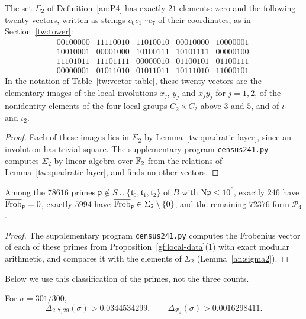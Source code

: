 \begin{lemma}\label{an:sigma2}
The set $\Sigma_2$ of Definition~\ref{an:P4} has exactly $21$ elements: zero
and the following twenty vectors, written as strings $c_0c_1\cdots c_7$ of
their coordinates, as in Section~\ref{tw:tower}:
\[
\begin{array}{ccccc}
 00100000&11110010&11010010&00010000&10000001\\
 10010001&00001000&10100111&10101111&00000100\\
 11101011&11101111&00000010&01100101&01100111\\
 00000001&01011010&01011011&10111010&11000101.
\end{array}
\]
In the notation of Table~\ref{tw:vector-table}, these twenty vectors are the
elementary images of the local involutions $x_j$, $y_j$ and $x_jy_j$ for
$j=1,2$, of the nonidentity elements of the four local groups
$C_2\times C_2$ above $3$ and $5$, and of $\iota_1$ and $\iota_2$.
\end{lemma}

\begin{proof}
Each of these images lies in $\Sigma_2$ by Lemma~\ref{tw:quadratic-layer},
since an involution has trivial square. The supplementary program
\texttt{census241.py} computes $\Sigma_2$ by linear algebra over $\mathbb F_2$
from the relations of Lemma~\ref{tw:quadratic-layer}, and finds no other
vectors.
\end{proof}

\begin{proposition}\label{an:census-prop}
Among the $78616$ primes
$\mathfrak p\notin S\cup\{\mathfrak t_0,\mathfrak t_1,\mathfrak t_2\}$ of
$B$ with $\mathrm N\mathfrak p\le10^6$, exactly $246$ have
$\overline{\operatorname{Frob}}_{\mathfrak p}=0$, exactly $5994$ have
$\overline{\operatorname{Frob}}_{\mathfrak p}\in\Sigma_2\setminus\{0\}$, and the remaining $72376$ form
$\mathcal P_4$.
\end{proposition}

\begin{proof}
The supplementary program \texttt{census241.py} computes the Frobenius
vector of each of these primes from Proposition~\ref{gf:local-data}(1) with
exact modular arithmetic, and compares it with the elements of $\Sigma_2$
(Lemma~\ref{an:sigma2}).
\end{proof}

Below we use this classification of the primes, not the three counts.

\begin{lemma}\label{an:corrections}
For $\sigma=301/300$,
\begin{equation}\label{an:census-values}
 \Delta_{2,7,29}(\sigma)>0.0344534299,\qquad
 \Delta_{\mathcal P_4}(\sigma)>0.0016298411.
\end{equation}
\end{lemma}

